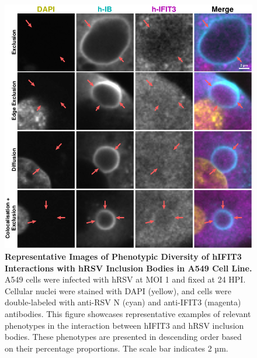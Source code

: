 \begin{figure}
    \centering
    \includegraphics[width=1\linewidth]{08. Chapter 3/Figs/02. Infection/03. IFIT3/03. a549 i3.pdf}
    \caption[Representative Images of Phenotypic Diversity of hIFIT3 Interactions with hRSV Inclusion Bodies in A549 Cell Line.]{\textbf{Representative Images of Phenotypic Diversity of hIFIT3 Interactions with hRSV Inclusion Bodies in A549 Cell Line.} A549 cells were infected with hRSV at MOI 1 and fixed at 24 HPI. Cellular nuclei were stained with DAPI (yellow), and cells were double-labeled with anti-RSV N (cyan) and anti-IFIT3 (magenta) antibodies. This figure showcases representative examples of relevant phenotypes in the interaction between hIFIT3 and hRSV inclusion bodies. These phenotypes are presented in descending order based on their percentage proportions. The scale bar indicates 2 µm.}
    \label{fig:Representative Images of Phenotypic Diversity of hIFIT3 Interactions with hRSV Inclusion Bodies in A549 Cell Line}
\end{figure}

